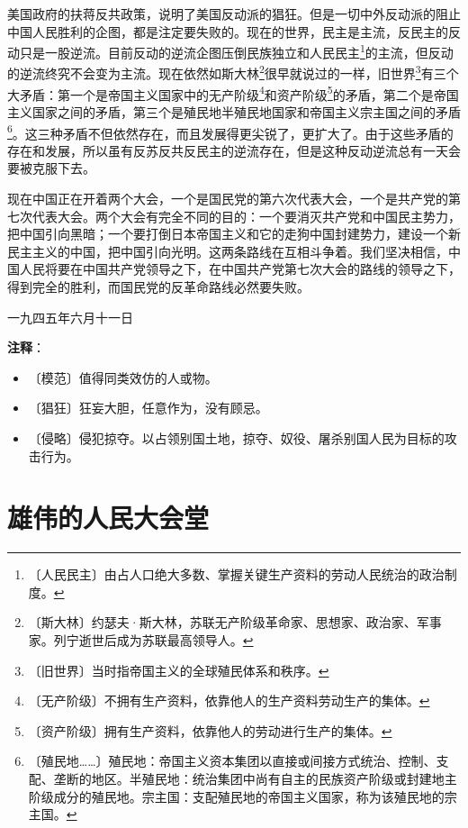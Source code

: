\documentclass[12pt,UTF-8,openany]{ctexbook}
\begin{document}
\begin{large}
    美国政府的扶蒋反共政策，说明了美国反动派的猖狂。但是一切中外反动派的阻止中国人民胜利的企图，都是注定要失败的。现在的世界，民主是主流，反民主的反动只是一股逆流。目前反动的逆流企图压倒民族独立和人民民主\footnote{〔人民民主〕由占人口绝大多数、掌握关键生产资料的劳动人民统治的政治制度。}的主流，但反动的逆流终究不会变为主流。现在依然如斯大林\footnote{〔斯大林〕约瑟夫·斯大林，苏联无产阶级革命家、思想家、政治家、军事家。列宁逝世后成为苏联最高领导人。}很早就说过的一样，旧世界\footnote{〔旧世界〕当时指帝国主义的全球殖民体系和秩序。}有三个大矛盾：第一个是帝国主义国家中的无产阶级\footnote{〔无产阶级〕不拥有生产资料，依靠他人的生产资料劳动生产的集体。}和资产阶级\footnote{〔资产阶级〕拥有生产资料，依靠他人的劳动进行生产的集体。}的矛盾，第二个是帝国主义国家之间的矛盾，第三个是殖民地半殖民地国家和帝国主义宗主国之间的矛盾\footnote{〔殖民地……〕殖民地：帝国主义资本集团以直接或间接方式统治、控制、支配、垄断的地区。半殖民地：统治集团中尚有自主的民族资产阶级或封建地主阶级成分的殖民地。宗主国：支配殖民地的帝国主义国家，称为该殖民地的宗主国。}。这三种矛盾不但依然存在，而且发展得更尖锐了，更扩大了。由于这些矛盾的存在和发展，所以虽有反苏反共反民主的逆流存在，但是这种反动逆流总有一天会要被克服下去。
    
    现在中国正在开着两个大会，一个是国民党的第六次代表大会，一个是共产党的第七次代表大会。两个大会有完全不同的目的：一个要消灭共产党和中国民主势力，把中国引向黑暗；一个要打倒日本帝国主义和它的走狗中国封建势力，建设一个新民主主义的中国，把中国引向光明。这两条路线在互相斗争着。我们坚决相信，中国人民将要在中国共产党领导之下，在中国共产党第七次大会的路线的领导之下，得到完全的胜利，而国民党的反革命路线必然要失败。
    
    \hfill 一九四五年六月十一日
    
\end{large}


\newpage

\textbf{注释}：

\vspace{-1em}

\begin{itemize}
    \setlength\itemsep{-0.2em}
    \item 〔模范〕值得同类效仿的人或物。
    \item 〔猖狂〕狂妄大胆，任意作为，没有顾忌。
    \item 〔侵略〕侵犯掠夺。以占领别国土地，掠夺、奴役、屠杀别国人民为目标的攻击行为。
\end{itemize}

\chapter{雄伟的人民大会堂}
\end{document}
